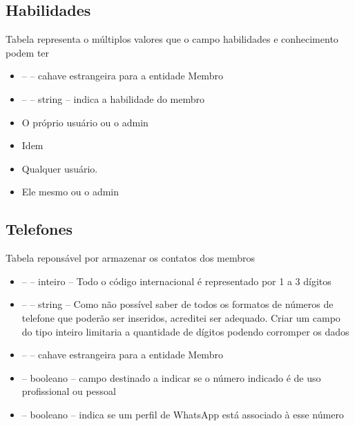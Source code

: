 \documentclass[11pt]{article}
\newcommand{\codigo}[3]{}
\begin{document}
        \subsection{Habilidades}

            Tabela representa o múltiplos valores que o campo habilidades e conhecimento podem ter
            \codigo{19}{28}{Habilidades}
            \begin{itemize}
                \item \key  \fk --  -- cahave estrangeira para a entidade Membro
                \item \key --  -- string -- indica a habilidade do membro
                \item \criar O próprio usuário ou o admin
                \item \atualizar Idem
                \item \ler Qualquer usuário.
                \item \deletar Ele mesmo ou o admin
            \end{itemize}

        \subsection{Telefones}

            Tabela reponsável por armazenar os contatos dos membros
            \codigo{30}{42}{Telefones}
            \begin{itemize}
                \item \key --  -- inteiro -- Todo o código internacional
                é representado por 1 a 3 dígitos
                \item \key --  -- string -- Como não possível saber de todos os
                formatos de números de telefone que poderão ser inseridos, acreditei ser adequado.
                Criar um campo do tipo inteiro limitaria a quantidade de dígitos podendo corromper
                os dados
                \item \key  \fk --  -- cahave estrangeira para a entidade Membro
                \item {} -- booleano -- campo destinado a indicar se o número
                indicado é de uso profissional ou pessoal
                \item {} -- booleano -- indica se um perfil de WhatsApp está associado
                à esse número
            \end{itemize}
\end{document}
